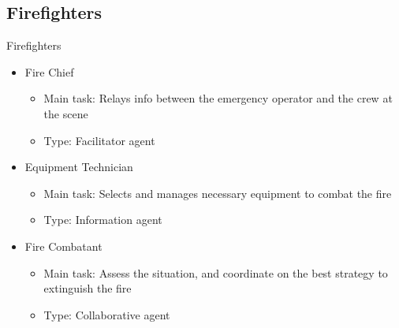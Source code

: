 \subsection{Firefighters}
\begin{frame}{Firefighters}
    \begin{itemize}
        \item Fire Chief
        \begin{itemize}
            \item Main task: Relays info between the emergency operator and the crew at the scene
            \item Type: Facilitator agent
        \end{itemize}
        \item Equipment Technician
                \begin{itemize}
            \item Main task: Selects and manages necessary equipment to combat the fire
            \item Type: Information agent
        \end{itemize}
        \item Fire Combatant
                \begin{itemize}
            \item Main task: Assess the situation, and coordinate on the best strategy to extinguish the fire
            \item Type: Collaborative agent
        \end{itemize}
    \end{itemize}
\end{frame} 